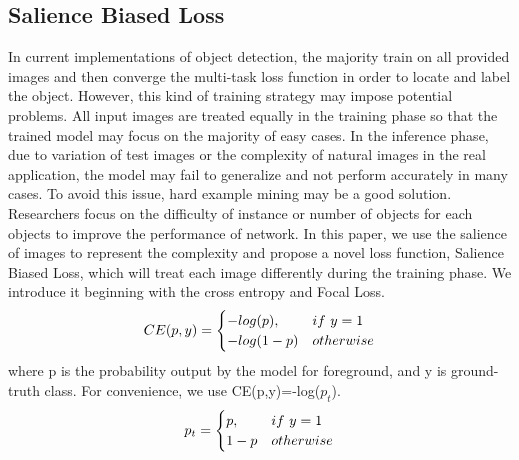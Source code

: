 \documentclass[conference]{IEEEtran}
\begin{document}
    \subsection{Salience Biased Loss}	
	In current implementations of object detection, the majority train on all provided images and then converge the multi-task loss function in order to locate and label the object. However, this kind of training strategy may impose potential problems. All input images are treated equally in the training phase so that the trained model may focus on the majority of easy cases. In the inference phase, due to variation of test images or the complexity of natural images in the real application, the model may fail to generalize and not perform accurately in many cases. To avoid this issue, hard example mining may be a good solution. Researchers focus on the difficulty of instance or number of objects for each objects to improve the performance of network. In this paper, we  use the salience of images to represent the complexity and propose a novel loss function, Salience Biased Loss, which will treat each image differently during the training phase. We introduce it beginning with the cross entropy and Focal Loss.
	\begin{equation}
		CE(p,y) =
		\begin{cases}
		-log(p), &if~y=1\cr  
		-log(1-p) &otherwise
		\end{cases}
		\label{eq:instance_prob}
    \end{equation}	
	where p is the probability output by the model for foreground, and y is ground-truth class. For convenience, we use CE(p,y)=-log(\(p_{t}\)).
	\begin{equation}
		p_{t} =
		\begin{cases}
		p, &if~y=1\cr  
		1-p &otherwise
		\end{cases}
		\label{eq:instance_prob}
    \end{equation}
    
\end{document}
